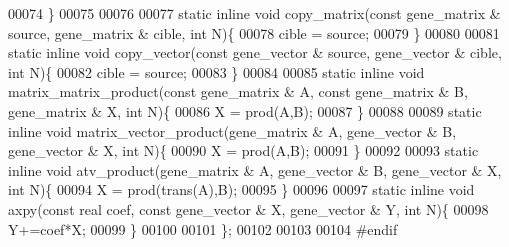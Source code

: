 \begin{DoxyCode}
00074   \}
00075 
00076 
00077   \textcolor{keyword}{static} \textcolor{keyword}{inline} \textcolor{keywordtype}{void} copy\_matrix(\textcolor{keyword}{const} gene\_matrix & source, gene\_matrix & cible, \textcolor{keywordtype}{int} N)\{
00078     cible = source;
00079   \}
00080 
00081   \textcolor{keyword}{static} \textcolor{keyword}{inline} \textcolor{keywordtype}{void} copy\_vector(\textcolor{keyword}{const} gene\_vector & source, gene\_vector & cible, \textcolor{keywordtype}{int} N)\{
00082     cible = source;
00083   \}
00084 
00085   \textcolor{keyword}{static} \textcolor{keyword}{inline} \textcolor{keywordtype}{void} matrix\_matrix\_product(\textcolor{keyword}{const} gene\_matrix & A, \textcolor{keyword}{const} gene\_matrix & B, gene\_matrix & X, \textcolor{keywordtype}{
      int} N)\{
00086     X = prod(A,B);
00087   \}
00088 
00089   \textcolor{keyword}{static} \textcolor{keyword}{inline} \textcolor{keywordtype}{void} matrix\_vector\_product(gene\_matrix & A, gene\_vector & B, gene\_vector & X, \textcolor{keywordtype}{int} N)\{
00090     X = prod(A,B);
00091   \}
00092 
00093   \textcolor{keyword}{static} \textcolor{keyword}{inline} \textcolor{keywordtype}{void} atv\_product(gene\_matrix & A, gene\_vector & B, gene\_vector & X, \textcolor{keywordtype}{int} N)\{
00094     X = prod(trans(A),B);
00095   \}
00096 
00097   \textcolor{keyword}{static} \textcolor{keyword}{inline} \textcolor{keywordtype}{void} axpy(\textcolor{keyword}{const} real coef, \textcolor{keyword}{const} gene\_vector & X, gene\_vector & Y, \textcolor{keywordtype}{int} N)\{
00098     Y+=coef*X;
00099   \}
00100 
00101 \};
00102 
00103 
00104 \textcolor{preprocessor}{#endif}
\end{DoxyCode}
